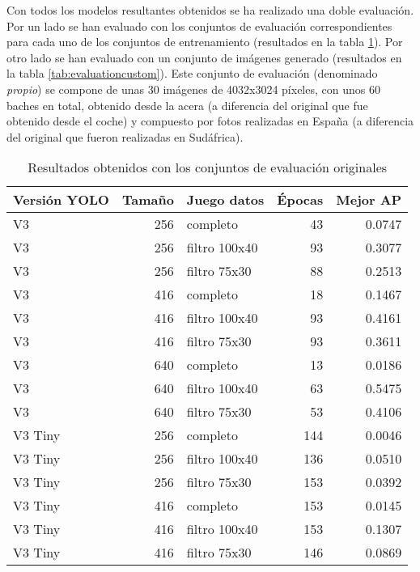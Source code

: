 Con todos los modelos resultantes obtenidos se ha realizado una doble evaluación. Por un lado se han evaluado con los conjuntos de evaluación correspondientes para cada uno de los conjuntos de entrenamiento (resultados en la tabla \ref{tab:evaluationoriginal}). Por otro lado se han evaluado con un conjunto de imágenes generado (resultados en la tabla \ref{tab:evaluationcustom}). Este conjunto de evaluación (denominado \textit{propio}) se compone de unas 30 imágenes de 4032x3024 píxeles, con unos 60 baches en total, obtenido desde la acera (a diferencia del original que fue obtenido desde el coche) y compuesto por fotos realizadas en España (a diferencia del original que fueron realizadas en Sudáfrica).

\begin{table}[H]
	\centering
	\begin{tabular}{lrlrr}
		\toprule
		Versión YOLO &  Tamaño &    Juego datos &  Épocas &  Mejor AP \\
		\midrule
		V3      &     256 &       completo &      43 &    0.0747 \\
		V3      &     256 &  filtro 100x40 &      93 &    0.3077 \\
		V3      &     256 &   filtro 75x30 &      88 &    0.2513 \\
		V3      &     416 &       completo &      18 &    0.1467 \\
		V3      &     416 &  filtro 100x40 &      93 &    0.4161 \\
		V3      &     416 &   filtro 75x30 &      93 &    0.3611 \\
		V3      &     640 &       completo &      13 &    0.0186 \\
		V3      &     640 &  filtro 100x40 &      63 &    0.5475 \\
		V3      &     640 &   filtro 75x30 &      53 &    0.4106 \\
		V3 Tiny &     256 &       completo &     144 &    0.0046 \\
		V3 Tiny &     256 &  filtro 100x40 &     136 &    0.0510 \\
		V3 Tiny &     256 &   filtro 75x30 &     153 &    0.0392 \\
		V3 Tiny &     416 &       completo &     153 &    0.0145 \\
		V3 Tiny &     416 &  filtro 100x40 &     153 &    0.1307 \\
		V3 Tiny &     416 &   filtro 75x30 &     146 &    0.0869 \\
		\bottomrule
	\end{tabular}
	\caption{Resultados obtenidos con los conjuntos de evaluación originales}
	\label{tab:evaluationoriginal}
\end{table}

